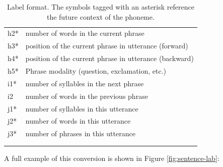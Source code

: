 \begin{longtable}[!htpb]{p{} p{}}
\toprule
h2* & number of words in the current phrase \\
h3* & position of the current phrase in utterance (forward) \\
h4* & position of the current phrase in utterance (backward) \\
h5* & Phrase modality (question, exclamation, etc.)\\
\midrule
i1* & number of syllables in the next phrase \\
i2 & number of words in the previous phrase \\
\midrule
j1* & number of syllables in this utterance \\
j2* & number of words in this utterance \\
j3* & number of phrases in this utterance \\
\bottomrule
\caption{\label{table:lab_format}Label format. The symbols tagged with an asterisk reference the future context of the phoneme.}\\
\label{tab:lab-format}
\end{longtable}
\doublespacing


A full example of this conversion is shown in Figure \ref{fig:sentence-lab}:

